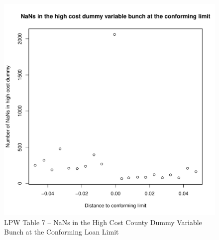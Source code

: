 \documentclass{article}
\begin{document}
\begin{figure}

    \caption{LPW Table 7 --  NaNs in the High Cost County Dummy Variable Bunch at the Conforming Loan Limit}
    
    \begin{center}
    \includegraphics[scale=0.5]{figures/nans_in_high_cost_dummy_bunching.pdf}
    \end{center}
    
\end{figure}

\clearpage
\pagebreak
\end{document}
